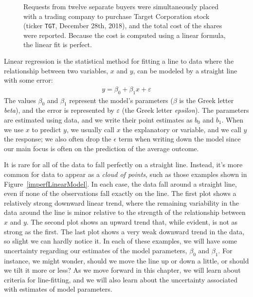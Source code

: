 \begin{figure}[h]
   \centering
   \caption{Requests from twelve separate buyers were
       simultaneously placed with a trading company to purchase
       Target Corporation stock
       (ticker \texttt{TGT}, December 28th, 2018),
       and the total cost of the shares were reported.
       Because the cost is computed using a linear formula,
       the linear fit is perfect.}
   \label{perfLinearModel}
\end{figure}

Linear regression is the statistical method for fitting
a line to data where the relationship between two variables,
$x$ and $y$, can be modeled by a straight line with some error:
\begin{align*}
y = \beta_0 + \beta_1x + \varepsilon
\end{align*}
The values $\beta_0$ and $\beta_1$ represent the model's
parameters
($\beta$ is the Greek letter
  \emph{beta}),
and the error is represented by $\varepsilon$
(the Greek letter \emph{epsilon}).
The parameters are estimated using data,
and we write their point estimates as $b_0$ and $b_1$.
When we use $x$ to predict $y$,
we usually call $x$ the explanatory
or  variable,
and we call $y$ the response;
we also often drop the $\epsilon$ term when writing down the
model since our main focus is often on the prediction of
the average outcome.

It is rare for all of the data to fall perfectly on a straight line.
Instead, it's more common for data to appear as
a \emph{cloud of points},
such as those examples shown in  Figure~\ref{imperfLinearModel}.
In each case, the data fall around a straight line,
even if none of the observations fall exactly on the line.
The first plot shows a relatively strong downward
linear trend,
where the remaining variability in the data around the
line is minor relative to the strength of the relationship
between $x$ and $y$.
The second plot shows an upward trend that,
while evident, is not as strong as the first.
The last plot shows a very weak downward trend in the data,
so slight we can hardly notice it.
In each of these examples,
we will have some uncertainty regarding our estimates
of the model parameters, $\beta_0$ and $\beta_1$.
For instance, we might wonder, should we move the line
up or down a little, or should we tilt it more or less?
As we move forward in this chapter,
we will learn about criteria for line-fitting,
and we will also learn about the uncertainty associated
with estimates of model parameters.

